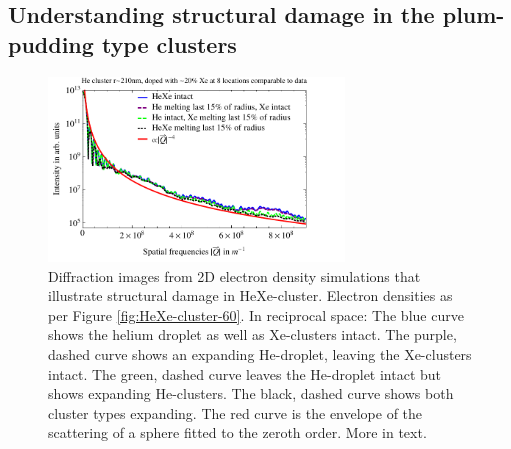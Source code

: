 \subsection{Understanding structural damage in the plum-pudding type clusters}\label{sec:helium-xenon-data}
\begin{figure}
	\centering
		\includegraphics[width=0.7\textwidth]{images/results/simulations-damage-explain2.pdf}
	\caption[Simulated structural damage scenarios in HeXe-clusters.]{Diffraction images from 2D electron density simulations that illustrate structural damage in HeXe-cluster. Electron densities as per Figure \ref{fig:HeXe-cluster-60}. In reciprocal space: The blue curve shows the helium droplet as well as Xe-clusters intact. The purple, dashed curve shows an expanding He-droplet, leaving the Xe-clusters intact. The green, dashed curve leaves the He-droplet intact but shows expanding He-clusters. The black, dashed curve shows both cluster types expanding. The red curve is the envelope of the scattering of a sphere fitted to the zeroth order. More in text.}
	\label{fig:simulations-damage-explain}
\end{figure}
